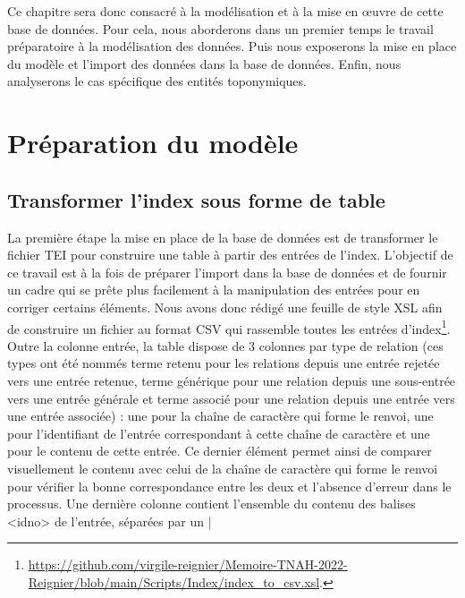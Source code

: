 \documentclass[a4paper,12pt,twoside]{book}
\begin{document}
	Ce chapitre sera donc consacré à la modélisation et à la mise en œuvre de cette base de données. Pour cela, nous aborderons dans un premier temps le travail préparatoire à la modélisation des données. Puis nous exposerons la mise en place du modèle et l'import des données dans la base de données. Enfin, nous analyserons le cas spécifique des entités toponymiques.
	
	\section{Préparation du modèle}
	
	\subsection{Transformer l'index sous forme de table}
	
	La première étape la mise en place de la base de données est de transformer le fichier TEI pour construire une table à partir des entrées de l'index. L'objectif de ce travail est à la fois de préparer l'import dans la base de données et de fournir un cadre qui se prête plus facilement à la manipulation des entrées pour en corriger certains éléments. Nous avons donc rédigé une feuille de style XSL afin de construire un fichier au format CSV qui rassemble toutes les entrées d'index\footnote{\url{https://github.com/virgile-reignier/Memoire-TNAH-2022-Reignier/blob/main/Scripts/Index/index_to_csv.xsl}.}. Outre la colonne \og entrée\fg{}, la table dispose de 3 colonnes par type de relation (ces types ont été nommés \og terme retenu\fg{} pour les relations depuis une entrée rejetée vers une entrée retenue, \og terme générique\fg{} pour une relation depuis une sous-entrée vers une entrée générale et \og terme associé\fg{} pour une relation depuis une entrée vers une entrée associée) : une pour la chaîne de caractère qui forme le renvoi, une pour l'identifiant de l'entrée correspondant à cette chaîne de caractère et une pour le contenu de cette entrée. Ce dernier élément permet ainsi de comparer visuellement le contenu avec celui de la chaîne de caractère qui forme le renvoi pour vérifier la bonne correspondance entre les deux et l'absence d'erreur dans le processus. Une dernière colonne contient l'ensemble du contenu des balises <idno> de l'entrée, séparées par un \og | \fg{}
	
\end{document}
